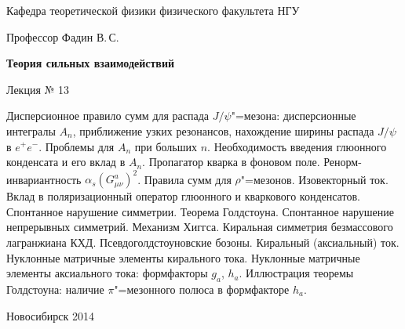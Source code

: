 \documentclass[12pt,pagesize,paper=192mm:108mm]{scrbook}
\begin{document}
\begin{titlepage}
\begin{center}
    Кафедра теоретической физики физического факультета НГУ

    \large
    Профессор Фадин В.\,С.
    \vspace{-0.5em}

    \huge
    \textbf{Теория сильных взаимодействий}
    
    \Large
    Лекция № 13
    \vfill
    
    \normalsize
    \begin{minipage}{0.95\linewidth}
      \small Дисперсионное правило сумм для распада $J/\psi$"=мезона:
      дисперсионные интегралы $A_n$, приближение узких резонансов,
      нахождение ширины распада $J/\psi$ в $e^+e^-$. Проблемы для
      $A_n$ при больших $n$. Необходимость введения глюонного
      конденсата и его вклад в $A_n$. Пропагатор кварка в фоновом
      поле. Ренорм-инвариантность
      $\alpha_s\left(G^a_{\mu\nu}\right)^2$. Правила сумм для
      $\rho$"=мезонов. Изовекторный ток. Вклад в поляризационный оператор
      глюонного и кваркового конденсатов. Спонтанное нарушение
      симметрии. Теорема Голдстоуна. Спонтанное нарушение непрерывных
      симметрий. Механизм Хиггса. Киральная симметрия безмассового
      лагранжиана КХД. Псевдоголдстоуновские бозоны. Киральный
      (аксиальный) ток. Нуклонные матричные элементы кирального
      тока. Нуклонные матричные элементы аксиального тока: формфакторы
      $g_a$, $h_a$. Иллюстрация теоремы Голдстоуна: наличие $\pi$"=мезонного
      полюса в формфакторе $h_a$.
    \end{minipage}
    \vfill
    
    \normalsize \ccbysa\hspace{0.5em} Новосибирск 2014   
  \end{center}
\end{titlepage}
\end{document}
